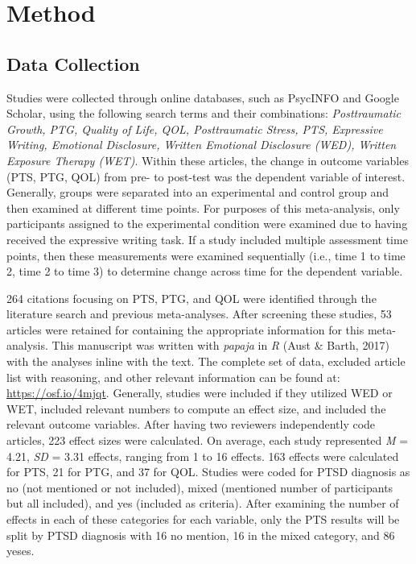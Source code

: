 \documentclass[man, mask]{apa6}
\theoremstyle{definition}
\theoremstyle{definition}
\theoremstyle{definition}
\theoremstyle{remark}
\begin{document}
\section{Method}\label{method}

\subsection{Data Collection}\label{data-collection}

Studies were collected through online databases, such as PsycINFO and
Google Scholar, using the following search terms and their combinations:
\emph{Posttraumatic Growth, PTG, Quality of Life, QOL, Posttraumatic
Stress, PTS, Expressive Writing, Emotional Disclosure, Written Emotional
Disclosure (WED), Written Exposure Therapy (WET)}. Within these
articles, the change in outcome variables (PTS, PTG, QOL) from pre- to
post-test was the dependent variable of interest. Generally, groups were
separated into an experimental and control group and then examined at
different time points. For purposes of this meta-analysis, only
participants assigned to the experimental condition were examined due to
having received the expressive writing task. If a study included
multiple assessment time points, then these measurements were examined
sequentially (i.e., time 1 to time 2, time 2 to time 3) to determine
change across time for the dependent variable.

264 citations focusing on PTS, PTG, and QOL were identified through the
literature search and previous meta-analyses. After screening these
studies, 53 articles were retained for containing the appropriate
information for this meta-analysis. This manuscript was written with
\emph{papaja} in \emph{R} (Aust \& Barth, 2017) with the analyses inline
with the text. The complete set of data, excluded article list with
reasoning, and other relevant information can be found at:
\url{https://osf.io/4mjqt}. Generally, studies were included if they
utilized WED or WET, included relevant numbers to compute an effect
size, and included the relevant outcome variables. After having two
reviewers independently code articles, 223 effect sizes were calculated.
On average, each study represented \emph{M} = 4.21, \emph{SD} = 3.31
effects, ranging from 1 to 16 effects. 163 effects were calculated for
PTS, 21 for PTG, and 37 for QOL. Studies were coded for PTSD diagnosis
as no (not mentioned or not included), mixed (mentioned number of
participants but all included), and yes (included as criteria). After
examining the number of effects in each of these categories for each
variable, only the PTS results will be split by PTSD diagnosis with 16
no mention, 16 in the mixed category, and 86 yeses.
\end{document}
